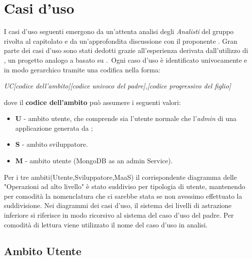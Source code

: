 \section{Casi d'uso}
I casi d'uso seguenti emergono da un'attenta analisi degli \textit{Analisti} del gruppo \GroupName{} rivolta al capitolato e da un'approfondita discussione con il proponente \Proponente{}. Gran parte dei casi d'uso sono stati dedotti grazie all'esperienza derivata dall'utilizzo di , un progetto analogo a \ProjectName{} basato su .\
Ogni caso d'uso è identificato univocamente e in modo gerarchico tramite una codifica nella forma:

\begin{center}

\textit{UC[codice dell'ambito][codice univoco del padre],[codice progressivo del figlio]}

\end{center} 

dove il \textbf{codice dell'ambito} può assumere i seguenti valori:

\begin{itemize}

  \item \textbf{U} - ambito utente, che comprende sia l'utente normale che l'\textit{admin} di una applicazione generata da \ProjectName{};
  \item \textbf{S} - ambito sviluppatore.
  \item \textbf{M} - ambito utente  (MongoDB as an admin Service).

\end{itemize}
Per i tre ambiti(Utente,Sviluppatore,MaaS) il corrispondente diagramma delle "Operazioni ad alto livello" è stato suddiviso per tipologia di utente, mantenendo per comodità la nomenclatura che ci sarebbe stata se non avessimo effettuato la suddivisione.
Nei diagrammi dei casi d'uso, il sistema dei livelli di astrazione inferiore si riferisce in modo ricorsivo al sistema del caso d'uso del padre. 
Per comodità di lettura viene utilizzato il nome del caso d'uso in analisi. 


\subsection{Ambito Utente}
